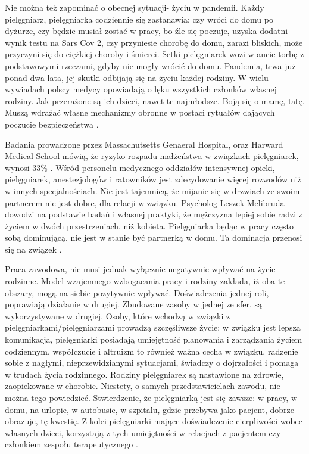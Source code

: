 \documentclass[a4paper,12pt,twoside,openright]{mwrep}
\begin{document}
Nie można też zapominać o obecnej sytuacji- życiu w pandemii. Każdy pielęgniarz, pielęgniarka codziennie się zastanawia: czy wróci do domu po dyżurze, czy będzie musiał zostać w pracy, bo źle się poczuje, uzyska dodatni wynik testu na Sars Cov 2, czy przyniesie chorobę do domu, zarazi bliskich, może przyczyni się do ciężkiej choroby i śmierci. Setki pielęgniarek wozi w aucie torbę z podstawowymi rzeczami, gdyby nie mogły wrócić do domu. Pandemia, trwa już ponad dwa lata, jej skutki odbijają się na życiu każdej rodziny. W wielu wywiadach polscy medycy opowiadają o lęku wszystkich członków własnej rodziny. Jak przerażone są ich dzieci, nawet te najmłodsze. Boją się o mamę, tatę. Muszą wdrażać własne mechanizmy obronne w postaci rytuałów dających poczucie bezpieczeństwa  \cite{wywiad}.

Badania prowadzone przez Massachutsetts Genaeral Hospital, oraz Harward Medical School mówią, że ryzyko rozpadu małżeństwa w związkach pielęgniarek, wynosi 33\% \cite{rozwody}.  Wśród personelu medycznego oddziałów intensywnej opieki, pielęgniarek, anestezjologów i ratowników jest zdecydowanie więcej rozwodów niż w innych specjalnościach.  Nie jest tajemnicą, że mijanie się w drzwiach ze swoim partnerem nie jest dobre, dla relacji w związku. Psycholog Leszek Melibruda dowodzi na podstawie badań i własnej praktyki, że mężczyzna lepiej sobie radzi z życiem w dwóch przestrzeniach, niż kobieta. Pielęgniarka będąc w pracy często sobą dominującą, nie jest w stanie być partnerką w domu. Ta dominacja przenosi się na związek \cite{melibruda}.

Praca zawodowa, nie musi jednak wyłącznie negatywnie wpływać na życie rodzinne. Model wzajemnego wzbogacania pracy i rodziny zakłada, iż oba te obszary, mogą na siebie pozytywnie wpływać. Doświadczenia jednej roli, poprawiają działanie w drugiej. Zbudowane zasoby w jednej ze sfer, są wykorzystywane w drugiej.  Osoby, które wchodzą w związki z pielęgniarkami/pielęgniarzami prowadzą szczęśliwsze życie: w związku jest lepsza komunikacja, pielęgniarki posiadają umiejętność planowania i zarządzania życiem codziennym, współczucie i altruizm to również ważna cecha w związku, radzenie sobie z nagłymi, nieprzewidzianymi sytuacjami, świadczy o dojrzałości i pomaga w trudach życia rodzinnego. Rodziny pielęgniarek są nastawione na zdrowie, zaopiekowane w chorobie. Niestety, o samych przedstawicielach zawodu, nie można tego powiedzieć. Stwierdzenie, że pielęgniarką jest się zawsze: w pracy, w domu, na urlopie, w autobusie, w szpitalu, gdzie przebywa jako pacjent, dobrze obrazuje, tę kwestię. Z kolei pielęgniarki mające doświadczenie cierpliwości wobec własnych dzieci, korzystają z tych umiejętności w relacjach z pacjentem czy członkiem zespołu terapeutycznego \cite{wzbogacanie}.
\end{document}
